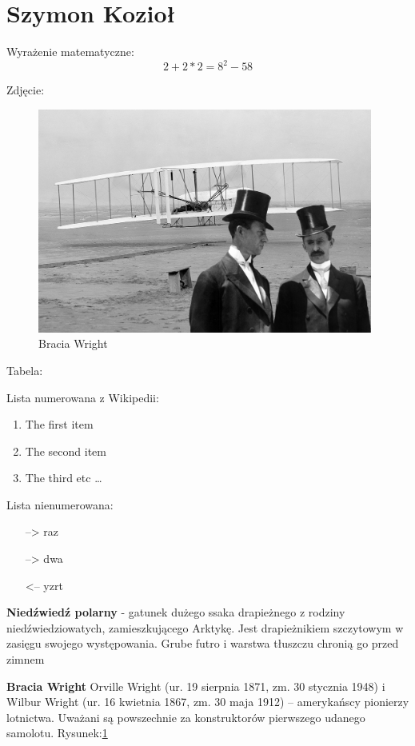 \section{Szymon Kozioł}

Wyrażenie matematyczne:
\[2+2*2 = 8^2 - 58\]

Zdjęcie:

\begin{figure}[h]
  \includegraphics[width=11cm]{pictures/tacd}
  \centering
  \caption{Bracia Wright}
  \label{fig:bracia}
\end{figure}

Tabela:\newline



Lista numerowana z Wikipedii:


\begin{enumerate}
  \item The first item
  \item The second item
  \item The third etc \ldots
\end{enumerate}

Lista nienumerowana:
\begin{itemize}
  \item[-->] raz
  \item[-->] dwa
  \item[<--] yzrt
\end{itemize}

\textbf{Niedźwiedź polarny} - gatunek dużego ssaka drapieżnego z rodziny niedźwiedziowatych, zamieszkującego Arktykę. Jest drapieżnikiem szczytowym w zasięgu swojego występowania. Grube futro i warstwa tłuszczu chronią go przed zimnem

\textbf{Bracia Wright}
\newline
Orville Wright (ur. 19 sierpnia 1871, zm. 30 stycznia 1948) i Wilbur Wright (ur. 16 kwietnia 1867, zm. 30 maja 1912) – amerykańscy pionierzy lotnictwa. Uważani są powszechnie za konstruktorów pierwszego udanego samolotu.
Rysunek:\ref{fig:bracia}
